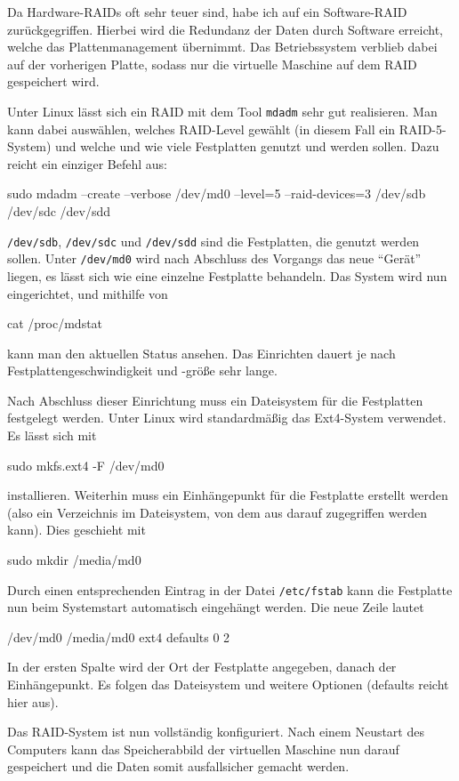 Da Hardware-RAIDs oft sehr teuer sind, habe ich auf ein Software-RAID zurückgegriffen.
Hierbei wird die Redundanz der Daten durch Software erreicht, welche das Plattenmanagement
übernimmt. Das Betriebssystem verblieb dabei auf der vorherigen Platte, sodass nur
die virtuelle Maschine auf dem RAID gespeichert wird.

Unter Linux lässt sich ein RAID mit dem Tool \texttt{mdadm} sehr gut realisieren.
Man kann dabei auswählen, welches RAID-Level gewählt (in diesem Fall ein RAID-5-System)
und welche und wie viele Festplatten genutzt und werden sollen. Dazu reicht ein
einziger Befehl aus:
\begin{code}
sudo mdadm --create --verbose /dev/md0 --level=5 --raid-devices=3 /dev/sdb /dev/sdc /dev/sdd
\end{code}
\texttt{/dev/sdb}, \texttt{/dev/sdc} und \texttt{/dev/sdd} sind die Festplatten,
die genutzt werden sollen. Unter \texttt{/dev/md0} wird nach Abschluss des Vorgangs
das neue ``Gerät'' liegen, es lässt sich wie eine einzelne Festplatte behandeln.
Das System wird nun eingerichtet, und mithilfe von
\begin{code}
cat /proc/mdstat
\end{code}
kann man den aktuellen Status ansehen. Das Einrichten dauert je nach Festplattengeschwindigkeit
und -größe sehr lange.

Nach Abschluss dieser Einrichtung muss ein Dateisystem für die Festplatten festgelegt
werden. Unter Linux wird standardmäßig das Ext4-System verwendet. Es lässt sich mit
\begin{code}
sudo mkfs.ext4 -F /dev/md0
\end{code}
installieren. Weiterhin muss ein Einhängepunkt für die Festplatte erstellt werden
(also ein Verzeichnis im Dateisystem, von dem aus darauf zugegriffen werden kann).
Dies geschieht mit
\begin{code}
sudo mkdir /media/md0
\end{code}
Durch einen entsprechenden Eintrag in der Datei \texttt{/etc/fstab} kann die Festplatte
nun beim Systemstart automatisch eingehängt werden. Die neue Zeile lautet
\begin{code}
/dev/md0 /media/md0 ext4 defaults 0 2
\end{code}
In der ersten Spalte wird der Ort der Festplatte angegeben, danach der Einhängepunkt.
Es folgen das Dateisystem und weitere Optionen (defaults reicht hier aus).

Das RAID-System ist nun vollständig konfiguriert. Nach einem Neustart des Computers
kann das Speicherabbild der virtuellen Maschine nun darauf gespeichert und die Daten
somit ausfallsicher gemacht werden.